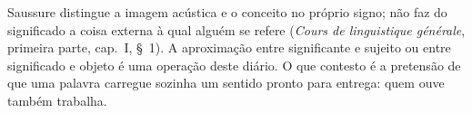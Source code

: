 Saussure distingue a imagem acústica e o conceito no próprio signo; não faz do significado a coisa externa à qual alguém se refere (\textit{Cours de linguistique générale}, primeira parte, cap.~I, \S~1). A aproximação entre significante e sujeito ou entre significado e objeto é uma operação deste diário. O que contesto é a pretensão de que uma palavra carregue sozinha um sentido pronto para entrega: quem ouve também trabalha.
